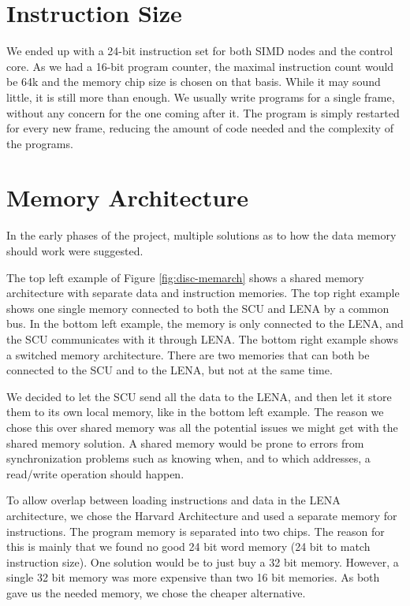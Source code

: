 \section{Instruction Size}
We ended up with a 24-bit instruction set for both \ac{SIMD} nodes and the
control core. As we had a 16-bit program counter, the maximal
instruction count would be 64k and the memory chip size is chosen on that
basis. While it may sound little, it is still more than enough. We usually
write programs for a single frame, without any concern for
the one coming after it. The program is simply restarted for every new frame,
reducing the amount of code needed and the complexity of the programs.

\section {Memory Architecture}
 

In the early phases of the project, multiple solutions as to how the data memory
should work were suggested. 

The top left example of Figure \ref{fig:disc-memarch} shows a shared memory architecture with separate data and
instruction memories. The top right example shows one single memory connected to
both the SCU and LENA by a common bus. In the bottom left example, the memory is
only connected to the LENA, and the SCU communicates with it through LENA. 
The bottom right example shows a switched memory architecture. There are two memories
that can both be connected to the SCU and to the LENA, but not at the same time.

We decided to let the \ac{SCU} send all the data to
the \ac{LENA}, and then let it store them to its own local memory, like in the bottom left example. The reason we
chose this over shared memory was all the potential issues we might get with the
shared memory solution. A shared memory would be prone to errors from
synchronization problems such as knowing when, and to which addresses, a
read/write operation should happen.

To allow overlap between loading instructions and data in the LENA architecture,
we chose the Harvard Architecture and used a separate memory for
instructions. The program memory is separated into two chips. The reason for
this is mainly that we found no good 24 bit word memory (24 bit to match instruction
size). One solution would be to just buy a 32 bit memory. However, a single 32 bit
memory was more expensive than two 16 bit memories. As both gave us the needed
memory, we chose the cheaper alternative.

